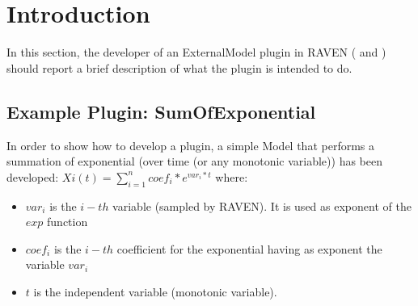 \section{Introduction}
\label{sec:Introduction}
In this section, the developer of an ExternalModel plugin in RAVEN ( \cite{RAVEN} and \cite{RAVENtheoryMan}) should
report a brief description of what the plugin is intended to do.

\subsection{Example Plugin: SumOfExponential}
 In order to show how to develop a plugin, a simple Model that performs a summation
 of exponential (over time (or any monotonic variable)) has been developed:
 \newline
 \begin{math}
        Xi(t)=\sum_{i=1}^{n} coef_i*e^{var_i*t}
  \end{math}
  \newline
 where:
 \begin{itemize}
    \item $var_i$ is the $i-th$ variable (sampled by RAVEN). It is used as exponent of the 
            $exp$ function
   \item $coef_i$ is the $i-th$  coefficient for the exponential having as exponent the  
            variable $var_i$
   \item $t$ is the independent variable (monotonic variable).
 \end{itemize}

